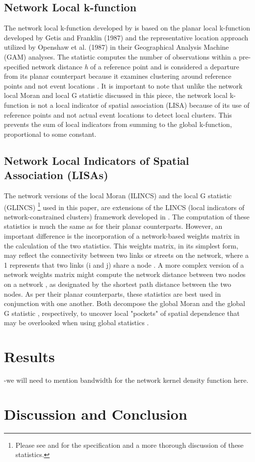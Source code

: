 \documentclass[12pt, letterpaper]{article}
\begin{document}
\subsection{Network Local k-function}
The network local k-function developed by \citep{yamada2007local} is based on the planar local k-function developed by Getis and Franklin (1987) and the representative location approach utilized by Openshaw et al. (1987) in their Geographical Analysis Machine (GAM) analyses. The statistic computes the number of observations within a pre-specified network distance \emph{h} of a reference point \citep{yamada2007local} and is considered a departure from its planar counterpart because it examines clustering around reference points and not event locations \citep{yamada2007local}. It is important to note that unlike the network local Moran and local G statistic discussed in this piece, the network local k-function is not a local indicator of spatial association (LISA) because of its use of reference points and not actual event locations to detect local clusters. This prevents the sum of local indicators from summing to the global k-function, proportional to some constant. \citep{yamada2007local}

\subsection{Network Local Indicators of Spatial Association (LISAs)}
The network versions of the local Moran (ILINCS) and the local G statistic (GLINCS) \footnote[1]{Please see \citet{anselin1995local} and \citet{getisord1992distance} for the specification and a more thorough discussion of these statistics.} used in this paper, are extensions of the LINCS (local indicators of network-constrained clusters) framework developed in \citet{yamada2007local}. The computation of these statistics is much the same as for their planar counterparts. However, an important difference is the incorporation of a network-based weights matrix in the calculation of the two statistics. This weights matrix, in its simplest form, may reflect the connectivity between two links or streets on the network, where a 1 represents that two links (i and j) share a node \citep{yamada2010local}. A more complex version of a network weights matrix might compute the network distance between two nodes on a network \citep{yamada2010local}, as designated by the shortest path distance between the two nodes. As per their planar counterparts, these statistics are best used in conjunction with one another. Both decompose the global Moran \citep{moran1948interpretation} and the global G statistic \citep{getisord1992distance}, respectively, to uncover local "pockets" of spatial dependence that may be overlooked when using global statistics \citep{getis2010analysis}. %

\section{Results}
-we will need to mention bandwidth for the network kernel density function here.

\section{Discussion and Conclusion}

\newpage
{}


\end{document}
